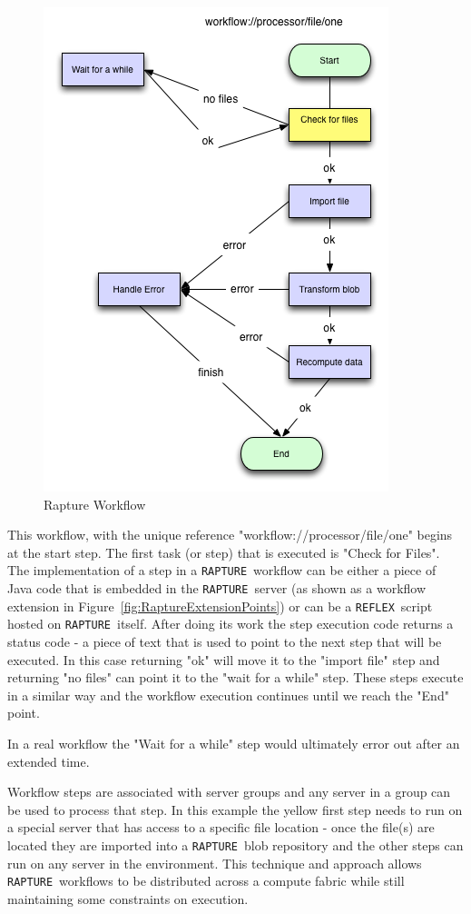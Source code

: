 \documentclass[12pt,twoside,a4paper]{book}
\newcommand{\Rapture}{\Verb+RAPTURE+~}
\newcommand{\Reflex}{\Verb+REFLEX+~}
\begin{document}
\begin{figure}[H]
\centering
\includegraphics[scale=0.75]{Graphics/RaptureWorkflowExplain}
\caption{Rapture Workflow}
\label{fig:WorkflowExample}
\end{figure}

This workflow, with the unique reference "workflow://processor/file/one" begins at the start step. The first
task (or step) that is executed is "Check for Files". The implementation of a step in a \Rapture workflow can be either
a piece of Java code that is embedded in the \Rapture server (as shown as a workflow extension in Figure~\vref{fig:RaptureExtensionPoints})
or can be a \Reflex script hosted on \Rapture itself. After doing its work the step execution code returns a status code - a piece of text
that is used to point to the next step that will be executed. In this case returning "ok" will move it to the "import file" step and returning
"no files" can point it to the "wait for a while" step. These steps execute in a similar way and the workflow execution continues until we
reach the "End" point.

In a real workflow the "Wait for a while" step would ultimately error out after an extended time.

Workflow steps are associated with server groups and any server in a group can be used to process that step. In this example the yellow first step
needs to run on a special server that has access to a specific file location - once the file(s) are located they are imported into a \Rapture blob repository
and the other steps can run on any server in the environment. This technique and approach allows \Rapture workflows to be distributed across a compute fabric while
still maintaining some constraints on execution.
\end{document}
